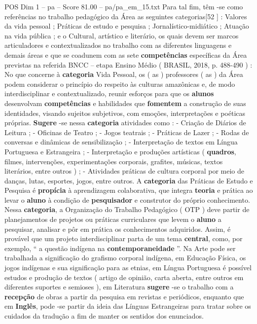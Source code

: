 \begin{textsample}{POS Dim 1 – pa – Score 81.00 – pa/pa\_em\_15.txt}
Para tal fim, têm -se como referências no trabalho pedagógico da Área as seguintes categorias[52 ] : Valores da vida pessoal ; Práticas de estudo e pesquisa ; Jornalístico-midiático ; Atuação na vida pública ; e o Cultural, artístico e literário, os quais devem ser marcos articuladores e contextualizados no trabalho com as diferentes linguagens e demais áreas e que se coadunem com as sete \textbf{competências} específicas da Área previstas na referida BNCC – etapa Ensino Médio ( BRASIL, 2018, p. 488-490 ) : No que concerne à \textbf{categoria} Vida Pessoal, os ( as ) professores ( as ) da Área podem considerar o princípio do respeito às culturas amazônicas e, de modo interdisciplinar e contextualizado, reunir esforços para que os \textbf{alunos} desenvolvam \textbf{competências} e habilidades que \textbf{fomentem} a construção de suas identidades, visando sujeitos subjetivos, com emoções, interpretações e poéticas próprias. \textbf{Sugere} -se nessa \textbf{categoria} atividades como : - Criação de Diários de Leitura ; - Oficinas de Teatro ; - Jogos teatrais ; - Práticas de Lazer ; - Rodas de conversas e dinâmicas de sensibilização ; - Interpretação de textos em Língua Portuguesa e Estrangeira ; - Interpretação e produções artísticas ( \textbf{quadros}, filmes, intervenções, experimentações corporais, grafites, músicas, textos literários, entre outros ) ; - Atividades práticas de cultura corporal por meio de danças, lutas, esportes, jogos, entre outros.
A \textbf{categoria} das Práticas de Estudo e Pesquisa é \textbf{propícia} à aprendizagem colaborativa, que integra \textbf{teoria} e prática ao levar o \textbf{aluno} à condição de \textbf{pesquisador} e construtor do próprio conhecimento.
Nessa \textbf{categoria}, a Organização do Trabalho Pedagógico ( OTP ) deve partir de planejamentos de projetos ou práticas curriculares que levem o \textbf{aluno} a pesquisar, analisar e pôr em prática os conhecimentos adquiridos.
Assim, é provável que um projeto interdisciplinar parta de um tema \textbf{central}, como, por exemplo, “ a questão indígena na \textbf{contemporaneidade} ”.
Na Arte pode ser trabalhada a significação do grafismo corporal indígena, em Educação Física, os jogos indígenas e sua significação para as etnias, em Língua Portuguesa é possível estudos e produção de textos ( artigo de opinião, carta aberta, entre outros em diferentes suportes e semioses ), em Literatura \textbf{sugere} -se o trabalho com a \textbf{recepção} de obras a partir da pesquisa em revistas e periódicos, enquanto que em \textbf{Inglês}, pode -se partir da ideia das Línguas Estrangeiras para tratar sobre os cuidados da tradução a fim de manter os sentidos dos enunciados.

\end{textsample}
